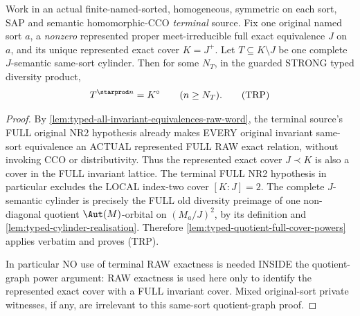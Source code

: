 \begin{lemma}
\label{lem:typed-relative-pure-power}
Work in an actual finite-named-sorted, homogeneous, symmetric
on each sort, SAP and semantic homomorphic-CCO
\emph{terminal} source. Fix one original named sort $a$,
a \emph{nonzero} represented proper meet-irreducible
full exact equivalence $J$ on $a$, and its unique
represented exact cover $K=J^+$. Let
$T\subseteq K\setminus J$ be one complete
$J$-semantic same-sort cylinder. Then for some
$N_T$, in the guarded STRONG typed diversity product,
\[
                         T^{\starprod n}=K^\circ
                   \qquad(n\ge N_T).
 \tag{TRP}\label{eq:typed-relative-pure-power}
\]
\end{lemma}
\begin{proof}
By \cref{lem:typed-all-invariant-equivalences-raw-word},
the terminal source's FULL original NR2 hypothesis
already makes EVERY original invariant same-sort
equivalence an ACTUAL represented FULL RAW exact
relation, without invoking CCO or distributivity.
Thus the represented exact cover $J\prec K$
is also a cover in the FULL invariant lattice.
The terminal FULL NR2 hypothesis in particular
excludes the LOCAL index-two cover $[K:J]=2$.
The complete $J$-semantic cylinder is precisely
the FULL old diversity preimage of one
non-diagonal quotient $\Aut(M)$-orbital on
$(M_a/J)^2$, by its definition and
\cref{lem:typed-cylinder-realisation}.
Therefore \cref{lem:typed-quotient-full-cover-powers}
applies verbatim and proves (TRP).

In particular NO use of terminal RAW exactness is
needed INSIDE the quotient-graph power argument:
RAW exactness is used here only to identify the
represented exact cover with a FULL invariant
cover. Mixed original-sort private witnesses,
if any, are irrelevant to this same-sort
quotient-graph proof.
\end{proof}


